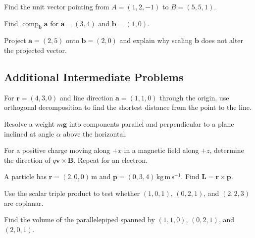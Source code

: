\begin{chapterexercise}
Find the unit vector pointing from $A=(1,2,-1)$ to $B=(5,5,1)$.
\end{chapterexercise}
\begin{chapterexercise}
Find $\operatorname{comp}_{\mathbf b}\mathbf a$ for $\mathbf a=(3,4)$ and $\mathbf b=(1,0)$.
\end{chapterexercise}
\begin{chapterexercise}
Project $\mathbf a=(2,5)$ onto $\mathbf b=(2,0)$ and explain why scaling $\mathbf b$ does not alter the projected vector.
\end{chapterexercise}

\subsection*{Additional Intermediate Problems}
\begin{chapterexercise}
For $\mathbf r=(4,3,0)$ and line direction $\mathbf a=(1,1,0)$ through the origin, use orthogonal decomposition to find the shortest distance from the point to the line.
\end{chapterexercise}
\begin{chapterexercise}
Resolve a weight $m\mathbf g$ into components parallel and perpendicular to a plane inclined at angle $\alpha$ above the horizontal.
\end{chapterexercise}
\begin{chapterexercise}
For a positive charge moving along $+x$ in a magnetic field along $+z$, determine the direction of $q\mathbf v\times\mathbf B$. Repeat for an electron.
\end{chapterexercise}
\begin{chapterexercise}
A particle has $\mathbf r=(2,0,0)\,\mathrm m$ and $\mathbf p=(0,3,4)\,\mathrm{kg\,m\,s^{-1}}$. Find $\mathbf L=\mathbf r\times\mathbf p$.
\end{chapterexercise}
\begin{chapterexercise}[Coplanarity]
Use the scalar triple product to test whether $(1,0,1)$, $(0,2,1)$, and $(2,2,3)$ are coplanar.
\end{chapterexercise}
\begin{chapterexercise}[Volume]
Find the volume of the parallelepiped spanned by $(1,1,0)$, $(0,2,1)$, and $(2,0,1)$.
\end{chapterexercise}

